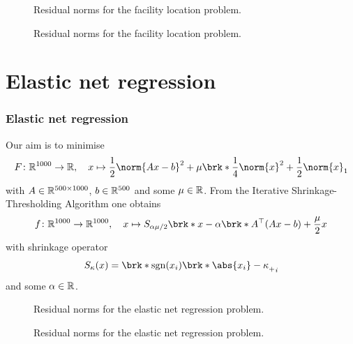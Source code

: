 \begin{frame}
	\begin{figure}
		\centering
		{\scriptsize
		
		}
		\caption{Residual norms for the facility location problem.}
	\end{figure}
\end{frame}


\begin{frame}
	\begin{figure}
		\centering
		{\scriptsize
		
		}
		\caption{Residual norms for the facility location problem.}
	\end{figure}
\end{frame}

\section{Elastic net regression}

\begin{frame}
	\frametitle{Elastic net regression}
	Our aim is to minimise
	\begin{align*}
		F\colon \R^{1000}\to \R, \quad x\mapsto \frac{1}{2}\norm{Ax-b}^2+\mu\brk*{\frac{1}{4}\norm{x}^2+\frac{1}{2}\norm{x}_1}
	\end{align*}
	with $A\in\mathbb{R}^{500\times 1000}$, $b\in\mathbb{R}^{500}$ and some $\mu\in\mathbb{R}$. From the Iterative Shrinkage-Thresholding Algorithm one obtains
	\begin{align*}
		f\colon\R^{1000}\to\R^{1000}, \quad x\mapsto S_{\alpha\mu/2}\brk*{x-\alpha\brk*{A^\top(Ax-b)+\frac{\mu}{2}x}}
	\end{align*}
	with shrinkage operator
	\begin{align*}
		S_\kappa(x) = \brk*{\sgn(x_i)\brk*{\abs{x_i}-\kappa}_+}_i
	\end{align*}
	and some $\alpha\in\mathbb{R}$.
\end{frame}


\begin{frame}
	\begin{figure}
		\centering
		{\scriptsize
		
		}
		\caption{Residual norms for the elastic net regression problem.}
	\end{figure}
\end{frame}

\begin{frame}
	\begin{figure}
		\centering
		{\scriptsize
		
		}
		\caption{Residual norms for the elastic net regression problem.}
	\end{figure}
\end{frame}

